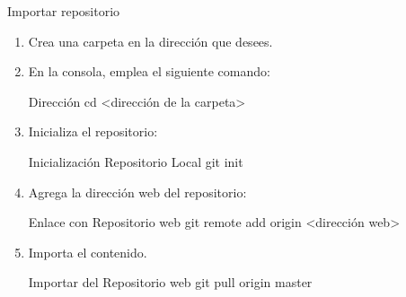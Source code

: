 \begin{frame}[t]{Importar repositorio}\vspace{-2pt}

\begin{enumerate}
	\item Crea una carpeta en la dirección que desees.
	\item En la consola, emplea el siguiente comando:
	\begin{block}{Dirección}
		cd <dirección de la carpeta>
	\end{block}
	\item Inicializa el repositorio:
	\begin{block}{Inicialización Repositorio Local}
		git init
	\end{block}
	\item Agrega la dirección web del repositorio:
	\begin{block}{Enlace con Repositorio web}
		git remote add origin <dirección web>
	\end{block}
	\item Importa el contenido.
	\begin{block}{Importar del Repositorio web}
		git pull origin master
	\end{block}
\end{enumerate}


\end{frame}